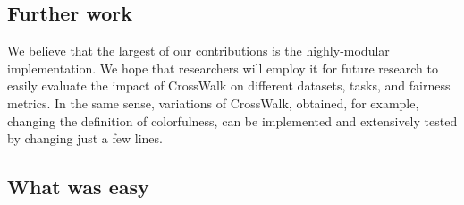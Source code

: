 

\subsection{Further work} 
We believe that the largest of our contributions is the highly-modular implementation. We hope that researchers will employ it for future research to easily evaluate the impact of CrossWalk on different datasets, tasks, and fairness metrics. In the same sense, variations of CrossWalk, obtained, for example, changing the definition of colorfulness, can be implemented and extensively tested by changing just a few lines.


\subsection{What was easy}


